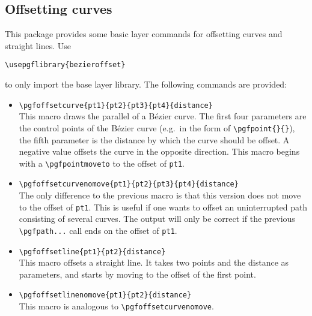 \documentclass[12pt,a4paper]{article}
\theoremstyle{definition}
\begin{document}
\subsection{Offsetting curves}
This package provides some basic layer commands for offsetting curves and straight lines. Use
\begin{verbatim}
\usepgflibrary{bezieroffset}
\end{verbatim}
to only import the base layer library. The following commands are provided:
\begin{itemize}
  \item \verb|\pgfoffsetcurve{pt1}{pt2}{pt3}{pt4}{distance}|\\%
    This macro draws the parallel of a Bézier curve. The first four parameters are the control points of the Bézier curve (e.g.\ in the form of \verb|\pgfpoint{}{}|), the fifth parameter is the distance by which the curve should be offset. A negative value offsets the curve in the opposite direction. This macro begins with a \verb|\pgfpointmoveto| to the offset of \texttt{pt1}.
  \item \verb|\pgfoffsetcurvenomove{pt1}{pt2}{pt3}{pt4}{distance}|\\%
    The only difference to the previous macro is that this version does not move to the offset of \texttt{pt1}. This is useful if one wants to offset an uninterrupted path consisting of several curves. The output will only be correct if the previous \verb|\pgfpath...| call ends on the offset of \texttt{pt1}.
  \item \verb|\pgfoffsetline{pt1}{pt2}{distance}|\\%
    This macro offsets a straight line. It takes two points and the distance as parameters, and starts by moving to the offset of the first point.
  \item \verb|\pgfoffsetlinenomove{pt1}{pt2}{distance}|\\%
    This macro is analogous to \verb|\pgfoffsetcurvenomove|.
\end{itemize}
\end{document}
